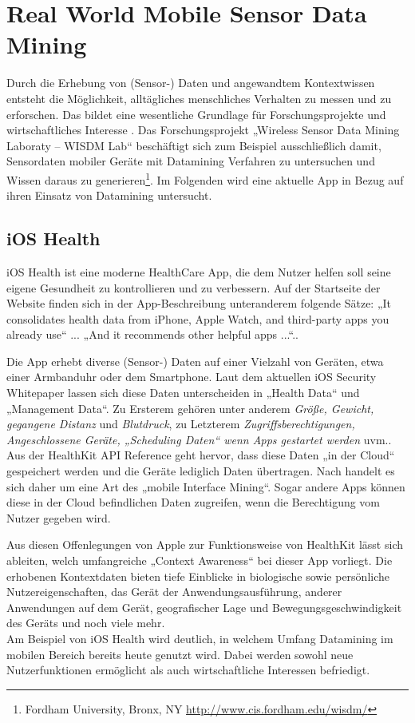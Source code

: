 \chapter{Real World Mobile Sensor Data Mining}
\label{chap:realworld}

Durch die Erhebung von (Sensor-) Daten und angewandtem Kontextwissen entsteht die Möglichkeit, alltägliches menschliches Verhalten zu messen und zu erforschen. Das bildet eine wesentliche Grundlage für Forschungsprojekte und wirtschaftliches Interesse \cite{lockhart2011}. Das Forschungsprojekt „Wireless Sensor Data Mining Laboraty -- WISDM Lab“ beschäftigt sich zum Beispiel ausschließlich damit, Sensordaten mobiler Geräte mit Datamining Verfahren zu untersuchen und Wissen daraus zu generieren\footnote{Fordham University, Bronx, NY \url{http://www.cis.fordham.edu/wisdm/}}. Im Folgenden wird eine aktuelle App in Bezug auf ihren Einsatz von Datamining untersucht.

\section{iOS Health}

iOS Health ist eine moderne HealthCare App, die dem Nutzer helfen soll seine eigene Gesundheit zu kontrollieren und zu verbessern. Auf der Startseite der Website finden sich in der App-Beschreibung unteranderem folgende Sätze: „It consolidates health data from iPhone, Apple Watch, and third-party apps you already use“ ... „And it recommends other helpful apps ...“.\cite{iosHealth}.

Die App erhebt diverse (Sensor-) Daten auf einer Vielzahl von Geräten, etwa einer Armbanduhr oder dem Smartphone. Laut dem aktuellen iOS Security Whitepaper lassen sich diese Daten unterscheiden in „Health Data“ und „Management Data“\cite{iosSecurity}. Zu Ersterem gehören unter anderem \emph{Größe, Gewicht, gegangene Distanz} und \emph{Blutdruck}, zu Letzterem \emph{Zugriffsberechtigungen, Angeschlossene Geräte, „Scheduling Daten“ wenn Apps gestartet werden} uvm.\cite{iosSecurity}. Aus der HealthKit API Reference \cite{hkApi} geht hervor, dass diese Daten „in der Cloud“ gespeichert werden und die Geräte lediglich Daten übertragen. Nach \cite{pocket2014} handelt es sich daher um eine Art des „mobile Interface Mining“. Sogar andere Apps können diese in der Cloud befindlichen Daten zugreifen, wenn die Berechtigung vom Nutzer gegeben wird.

Aus diesen Offenlegungen von Apple zur Funktionsweise von HealthKit lässt sich ableiten, welch umfangreiche „Context Awareness“ bei dieser App vorliegt. Die erhobenen Kontextdaten bieten tiefe Einblicke in biologische sowie persönliche Nutzereigenschaften, das Gerät der Anwendungsausführung, anderer Anwendungen auf dem Gerät, geografischer Lage und Bewegungsgeschwindigkeit des Geräts und noch viele mehr.\\

Am Beispiel von iOS Health wird deutlich, in welchem Umfang Datamining im mobilen Bereich bereits heute genutzt wird. Dabei werden sowohl neue Nutzerfunktionen ermöglicht als auch wirtschaftliche Interessen befriedigt.